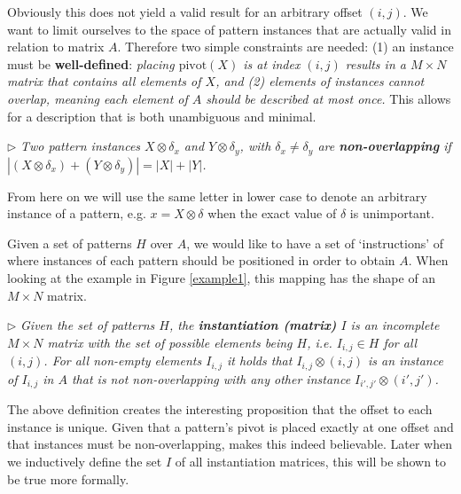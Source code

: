 \documentclass{llncs}
\begin{document}
Obviously this does not yield a valid result for an arbitrary offset $(i,j)$. We want to limit ourselves to the space of pattern instances that are actually valid in relation to matrix $A$. Therefore two simple constraints are needed: (1) an instance must be \textbf{well-defined}: \emph{placing $\mathrm{pivot}(X)$ is at index $(i,j)$ results in a $M\times N$ matrix that contains all elements of $X$, and (2) elements of instances cannot overlap, meaning each element of $A$ should be described at most once.} This allows for a description that is both unambiguous and minimal.

\smallskip
\noindent $\triangleright$
\emph{Two pattern instances $X \otimes \delta_x$ and $Y \otimes \delta_y$, with $\delta_x \neq \delta_y$ are \textbf{non-overlapping} if $|(X \otimes \delta_x) + (Y \otimes \delta_y)| = |X|+|Y|$.}
\smallskip

From here on we will use the same letter in lower case to denote an arbitrary instance of a pattern, e.g. $x = X \otimes \delta$ when the exact value of $\delta$ is unimportant.

Given a set of patterns $H$ over $A$, we would like to have a set of `instructions' of where instances of each pattern should be positioned in order to obtain $A$. When looking at the example in Figure \ref{example1}, this mapping has the shape of an $M\times N$ matrix.

\smallskip
\noindent $\triangleright$
\emph{Given the set of patterns $H$, the \textbf{instantiation (matrix)} ${I}$ is an incomplete $M\times N$ matrix with the set of possible elements being $H$, i.e. ${I}_{i,j} \in H$ for all $(i,j)$. For all non-empty elements ${I}_{i,j}$ it holds that ${I}_{i,j} \otimes (i,j)$ is an instance of ${I}_{i,j}$ in $A$ that is not non-overlapping with any other instance ${I}_{i',j'} \otimes (i',j')$.}
\smallskip

The above definition creates the interesting proposition that the offset to each instance is unique. Given that a pattern's pivot is placed exactly at one offset and that instances must be non-overlapping, makes this indeed believable. Later when we inductively define the set ${I}$ of all instantiation matrices, this will be shown to be true more formally. 
\end{document}
